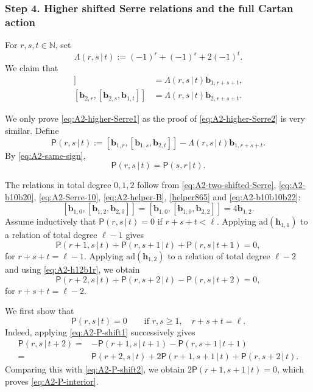 \documentclass[11pt,reqno]{amsart}
\numberwithin{equation}{section}
\theoremstyle{definition}
\theoremstyle{remark}
\newcommand{\bN}{\mathbb{N}}
\newcommand{\bb}{\mathbf{b}}
\newcommand{\bh}{\mathbf{h}}
\newcommand{\gge}{\geqslant}
\newcommand{\ad}{\mathrm{ad}}
\begin{document}
\subsubsection*{Step 4. Higher shifted Serre relations and the full Cartan action}
For $r,s,t\in\bN$, set
\begin{equation*}
\Lambda(r,s\,|\,t)
:=
(-1)^r+(-1)^s+2(-1)^t.
\end{equation*}
We claim that
\begin{align}
[\bb_{1,r},[\bb_{1,s},\bb_{2,t}]]
&=
\Lambda(r,s\,|\,t)\bb_{1,r+s+t},
\label{eq:A2-higher-Serre1}
\\
[\bb_{2,r},[\bb_{2,s},\bb_{1,t}]]
&=
\Lambda(r,s\,|\,t)\bb_{2,r+s+t}.
\label{eq:A2-higher-Serre2}
\end{align}

We only prove \eqref{eq:A2-higher-Serre1} as the proof of \eqref{eq:A2-higher-Serre2} is very similar.  Define
\begin{equation}\label{eq:A2-P}
\mathsf P(r,s\,|\,t)
:=
[\bb_{1,r},[\bb_{1,s},\bb_{2,t}]]
-
\Lambda(r,s\,|\,t)\bb_{1,r+s+t}.
\end{equation}
By \eqref{eq:A2-same-sign},
\begin{equation}\label{eq:A2-P-sym}
\mathsf P(r,s\,|\,t)=\mathsf P(s,r\,|\,t).
\end{equation}

The relations in total degree $0,1,2$ follow from
\eqref{eq:A2-two-shifted-Serre}, \eqref{eq:A2-b10b20},
\eqref{eq:A2-Serre-10},
\eqref{eq:A2-helper-B}, \eqref{helper865}
and \eqref{eq:A2-b10b10b22}: 
\[
[\bb_{1,0},[\bb_{1,2},\bb_{2,0}]]=[\bb_{1,0},[\bb_{1,0},\bb_{2,2}]]=4\bb_{1,2}.
\]
Assume inductively that $\mathsf P(r,s\,|\,t)=0$ if $r+s+t<\ell$. Applying $\ad(\bh_{1,1})$ to a relation of total degree $\ell-1$ gives
\begin{equation}\label{eq:A2-P-shift1}
\mathsf P(r+1,s\,|\,t)
+
\mathsf P(r,s+1\,|\,t)
+
\mathsf P(r,s\,|\,t+1)
=
0,
\end{equation}
for $r+s+t=\ell-1$. Applying $\ad(\bh_{1,2})$ to a relation of total degree $\ell-2$ and
using
\eqref{eq:A2-h12b1r}, we obtain
\begin{equation}\label{eq:A2-P-shift2}
\mathsf P(r+2,s\,|\,t)
+
\mathsf P(r,s+2\,|\,t)
-
\mathsf P(r,s\,|\,t+2)
=
0,
\end{equation}
for $r+s+t=\ell-2$.

We first show that
\begin{equation}\label{eq:A2-P-interior}
\mathsf P(r,s\,|\,t)=0
\qquad
\text{if }r,s\gge1,\quad r+s+t=\ell.
\end{equation}
Indeed, applying \eqref{eq:A2-P-shift1} successively gives
\begin{align*}
\mathsf P(r,s\,|\,t+2)
={}&
-\mathsf P(r+1,s\,|\,t+1)
-\mathsf P(r,s+1\,|\,t+1)
\\
={}&
\mathsf P(r+2,s\,|\,t)
+
2\mathsf P(r+1,s+1\,|\,t)
+
\mathsf P(r,s+2\,|\,t).
\end{align*}
Comparing this with \eqref{eq:A2-P-shift2}, we obtain $2\mathsf P(r+1,s+1\,|\,t)=0$,
which proves \eqref{eq:A2-P-interior}.
\end{document}

